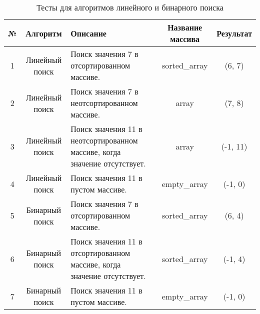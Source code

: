 \begin{table}[H]
\caption{Тесты для алгоритмов линейного и бинарного поиска}
\small
\centering\begin{tabular}{|c|c|m{5cm}|c|c|}
        \hline
        \textbf{№} & \textbf{Алгоритм} & \textbf{Описание} & \textbf{Название массива} & \textbf{Результат} \\
        \hline
        1 & Линейный поиск & Поиск значения 7 в отсортированном массиве. & sorted\_array & (6, 7) \\
        \hline
        2 & Линейный поиск & Поиск значения 7 в неотсортированном массиве. & array & (7, 8) \\
        \hline
        3 & Линейный поиск & Поиск значения 11 в неотсортированном массиве, когда значение отсутствует. & array & (-1, 11) \\
        \hline
        4 & Линейный поиск & Поиск значения 11 в пустом массиве. & empty\_array & (-1, 0) \\
        \hline
        5 & Бинарный поиск & Поиск значения 7 в отсортированном массиве. & sorted\_array & (6, 4) \\
        \hline
        6 & Бинарный поиск & Поиск значения 11 в отсортированном массиве, когда значение отсутствует. & sorted\_array & (-1, 4) \\
        \hline
        7 & Бинарный поиск & Поиск значения 11 в пустом массиве. & empty\_array & (-1, 0) \\
        \hline
    \end{tabular}
\label{table:tests}
\end{table}
